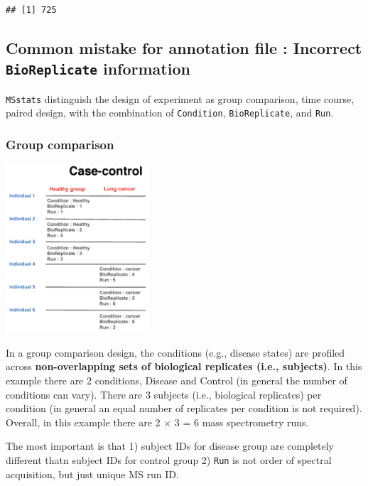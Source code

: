 \documentclass[]{book}
\begin{document}
\begin{verbatim}
## [1] 725
\end{verbatim}

\hypertarget{common-mistake-for-annotation-file-incorrect-bioreplicate-information}{%
\subsection{\texorpdfstring{Common mistake for annotation file : Incorrect \texttt{BioReplicate} information}{Common mistake for annotation file : Incorrect BioReplicate information}}\label{common-mistake-for-annotation-file-incorrect-bioreplicate-information}}

\texttt{MSstats} distinguish the design of experiment as group comparison, time course, paired design, with the combination of \texttt{Condition}, \texttt{BioReplicate}, and \texttt{Run}.

\hypertarget{group-comparison}{%
\subsubsection{Group comparison}\label{group-comparison}}

\includegraphics[width=0.4\textwidth,height=\textheight]{img/expdesign_group.png}

In a group comparison design, the conditions (e.g., disease states) are profiled across \textbf{non-overlapping sets of biological replicates (i.e., subjects)}. In this example there are 2 conditions, Disease and Control (in general the number of conditions can vary). There are 3 subjects (i.e., biological replicates) per condition (in general an equal number of replicates per condition is not required). Overall, in this example there are 2 × 3 = 6 mass spectrometry runs.

The most important is that 1) subject IDs for disease group are completely different thatn subject IDs for control group 2) \texttt{Run} is not order of spectral acquisition, but just unique MS run ID.
\end{document}
